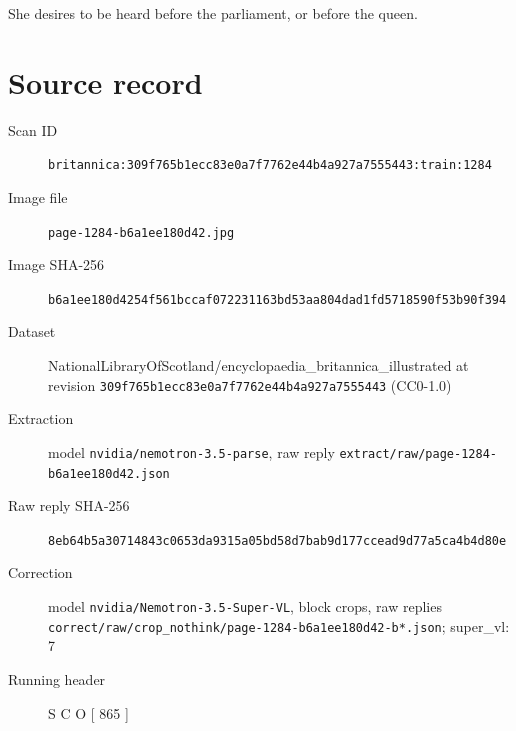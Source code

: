 \documentclass{article}
\begin{document}
She desires to be heard before the parliament, or before the queen.


\section*{Source record}
\begin{description}
\item[Scan ID] \texttt{britannica:309f765b1ecc83e0a7f7762e44b4a927a7555443:train:1284}
\item[Image file] \texttt{page-1284-b6a1ee180d42.jpg}
\item[Image SHA-256] \texttt{b6a1ee180d4254f561bccaf072231163bd53aa804dad1fd5718590f53b90f394}
\item[Dataset] NationalLibraryOfScotland/encyclopaedia\_britannica\_illustrated at revision \texttt{309f765b1ecc83e0a7f7762e44b4a927a7555443} (CC0-1.0)
\item[Extraction] model \texttt{nvidia/nemotron-3.5-parse}, raw reply \texttt{extract/raw/page-1284-b6a1ee180d42.json}
\item[Raw reply SHA-256] \texttt{8eb64b5a30714843c0653da9315a05bd58d7bab9d177ccead9d77a5ca4b4d80e}
\item[Correction] model \texttt{nvidia/Nemotron-3.5-Super-VL}, block crops, raw replies \texttt{correct/raw/crop\_nothink/page-1284-b6a1ee180d42-b*.json}; super\_vl: 7
\item[Running header] S C O [ 865 ]
\end{description}
\end{document}
